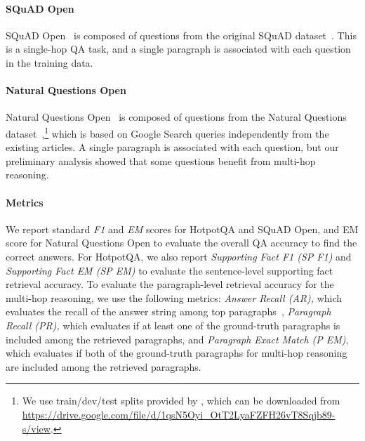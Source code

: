 \vspace{-2mm}\paragraph{SQuAD Open}
SQuAD Open~\citep{chen2017reading} is composed of questions from the original SQuAD dataset~\citep{rajpurkar2016squad}. 
This is a single-hop QA task, and a single paragraph is associated with each question in the training data.

\vspace{-2mm}\paragraph{Natural Questions Open}
Natural Questions Open~\citep{lee-chang-toutanova:2019:ACL2019} is composed of questions from the Natural Questions dataset~\citep{kwiatkowski2019natural},\footnote{We use train/dev/test splits provided by \cite{min2019discrete}, which can be downloaded from \url{https://drive.google.com/file/d/1qsN5Oyi_OtT2LyaFZFH26vT8Sqjb89-s/view}.} which is based on Google Search queries independently from the existing articles.
A single paragraph is associated with each question, but our preliminary analysis showed that some questions benefit from multi-hop reasoning.

\vspace{-2mm}\paragraph{Metrics} 
We report standard {\it F1} and {\it EM} scores for HotpotQA and SQuAD Open, and EM score for Natural Questions Open to evaluate the overall QA accuracy to find the correct answers. For HotpotQA, we also report {\it Supporting Fact F1 (SP F1)} and {\it Supporting Fact EM (SP EM)} to evaluate the sentence-level supporting fact retrieval accuracy.
To evaluate the paragraph-level retrieval accuracy for the multi-hop reasoning, we use the following metrics: {\it Answer Recall (AR),} which evaluates the recall of the answer string among top paragraphs~\citep{wang2018r,das2019multi}, 
{\it Paragraph Recall (PR),} which evaluates 
if at least one of the ground-truth paragraphs is included among the retrieved paragraphs, and 
{\it Paragraph Exact Match (P EM)},
which evaluates if both of the ground-truth paragraphs for multi-hop reasoning are included among the retrieved paragraphs.

